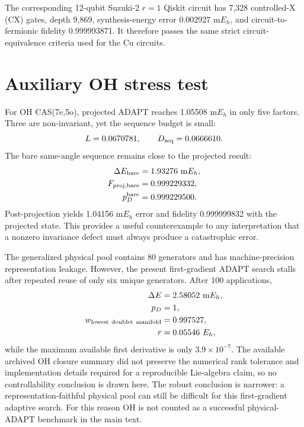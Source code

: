 \documentclass[
 aip,
 jcp,
 amsmath,amssymb,
 preprint
]{revtex4-2}
\begin{document}
The corresponding 12-qubit Suzuki-2 $r=1$ Qiskit circuit has 7,328 controlled-X (CX) gates, depth 9,869, synthesis-energy error 0.002927 m$E_h$, and circuit-to-fermionic fidelity 0.999993871.
It therefore passes the same strict circuit-equivalence criteria used for the Cu circuits.

\section{Auxiliary OH stress test}

For OH CAS(7e,5o), projected ADAPT reaches 1.05508 m$E_h$ in only five factors.
Three are non-invariant, yet the sequence budget is small:
\begin{equation}
L=0.0670781,\qquad D_{\rm seq}=0.0666610.
\end{equation}
The bare same-angle sequence remains close to the projected result:
\begin{align}
\Delta E_{\rm bare}&=1.93276~{\rm m}E_h,\\
F_{\rm proj,bare}&=0.999229332,\\
p_D^{\rm bare}&=0.999229500.
\end{align}
Post-projection yields 1.04156 m$E_h$ error and fidelity 0.999999832 with the projected state.
This provides a useful counterexample to any interpretation that a nonzero invariance defect must always produce a catastrophic error.

The generalized physical pool contains 80 generators and has machine-precision representation leakage.
However, the present first-gradient ADAPT search stalls after repeated reuse of only six unique generators.
After 100 applications,
\begin{align}
\Delta E&=2.58052~{\rm m}E_h,\\
p_D&=1,\\
w_{\rm lowest\ doublet\ manifold}&=0.997527,\\
r&=0.05546~E_h,
\end{align}
while the maximum available first derivative is only $3.9\times10^{-7}$.
The available archived OH closure summary did not preserve the numerical rank tolerance and implementation details required for a reproducible Lie-algebra claim, so no controllability conclusion is drawn here.
The robust conclusion is narrower: a representation-faithful physical pool can still be difficult for this first-gradient adaptive search.
For this reason OH is not counted as a successful physical-ADAPT benchmark in the main text.
\end{document}
